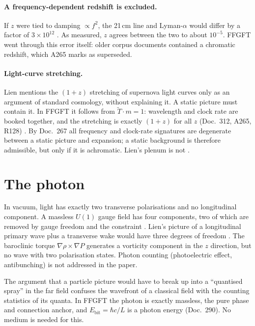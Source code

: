 \paragraph{A frequency-dependent redshift is excluded.}
If $z$ were tied to damping $\propto f^2$, the 21\,cm line and Lyman-$\alpha$
would differ by a factor of $3\times10^{12}$ \KM. As measured, $z$ agrees
between the two to about $10^{-5}$. FFGFT went through this error itself:
older corpus documents contained a chromatic redshift, which A265 marks as
superseded.

\paragraph{Light-curve stretching.}
Lien mentions the $(1+z)$ stretching of supernova light curves only as an
argument of standard cosmology, without explaining it. A static picture must
contain it. In FFGFT it follows from $\tilde T\cdot m=1$: wavelength and clock
rate are booked together, and the stretching is exactly $(1+z)$ for all $z$
(Doc.~312, A265, R128) \BM. By Doc.~267 all frequency and clock-rate
signatures are degenerate between a static picture and expansion; a static
background is therefore admissible, but only if it is achromatic. Lien's
plenum is not \XM.

\section{The photon}

In vacuum, light has exactly two transverse polarisations and no
longitudinal component. A massless $U(1)$ gauge field has four components,
two of which are removed by gauge freedom and the constraint \BM. Lien's
picture of a longitudinal primary wave plus a transverse wake would have
three degrees of freedom \XM. The baroclinic torque $\nabla\rho\times\nabla P$
generates a vorticity component in the $z$ direction, but no wave with two
polarisation states. Photon counting (photoelectric effect, antibunching) is
not addressed in the paper.

The argument that a particle picture would have to break up into a
\enquote{quantised spray} in the far field confuses the wavefront of a
classical field with the counting statistics of its quanta. In FFGFT the
photon is exactly massless, the pure phase and connection anchor, and
$E_\text{bit}=\hbar c/L$ is a photon energy (Doc.~290). No medium is needed
for this.

